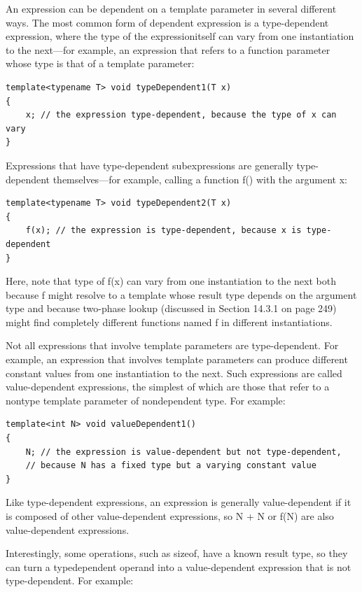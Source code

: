 An expression can be dependent on a template parameter in several different ways. The most common form of dependent expression is a type-dependent expression, where the type of the expressionitself can vary from one instantiation to the next—for example, an expression that refers to a function parameter whose type is that of a template parameter:

\begin{lstlisting}[style=styleCXX]
template<typename T> void typeDependent1(T x)
{
	x; // the expression type-dependent, because the type of x can vary
}
\end{lstlisting}

Expressions that have type-dependent subexpressions are generally type-dependent themselves—for example, calling a function f() with the argument x:

\begin{lstlisting}[style=styleCXX]
template<typename T> void typeDependent2(T x)
{
	f(x); // the expression is type-dependent, because x is type-dependent
}
\end{lstlisting}

Here, note that type of f(x) can vary from one instantiation to the next both because f might resolve to a template whose result type depends on the argument type and because two-phase lookup (discussed in Section 14.3.1 on page 249) might find completely different functions named f in different instantiations.

Not all expressions that involve template parameters are type-dependent. For example, an expression that involves template parameters can produce different constant values from one instantiation to the next. Such expressions are called value-dependent expressions, the simplest of which are those that refer to a nontype template parameter of nondependent type. For example:

\begin{lstlisting}[style=styleCXX]
template<int N> void valueDependent1()
{
	N; // the expression is value-dependent but not type-dependent,
	// because N has a fixed type but a varying constant value
}
\end{lstlisting}

Like type-dependent expressions, an expression is generally value-dependent if it is composed of other value-dependent expressions, so N + N or f(N) are also value-dependent expressions.

Interestingly, some operations, such as sizeof, have a known result type, so they can turn a typedependent operand into a value-dependent expression that is not type-dependent. For example:

